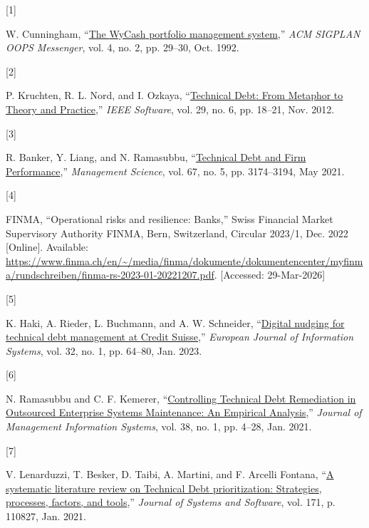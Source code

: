 \documentclass[
  journal,
]{IEEEtran}%
\newlength{\cslhangindent}
\newlength{\csllabelwidth}
\newenvironment{CSLReferences}[2] %
 {\begin{list}{}{%
  \setlength{\itemindent}{0pt}
  \setlength{\leftmargin}{0pt}
  \setlength{\parsep}{0pt}
  \ifodd #1
   \setlength{\leftmargin}{\cslhangindent}
   \setlength{\itemindent}{-1\cslhangindent}
  \fi
  \setlength{\itemsep}{#2\baselineskip}}}
 {\end{list}}
\newcommand{\CSLLeftMargin}[1]{\parbox[t]{\csllabelwidth}{\strut#1\strut}}
\newcommand{\CSLRightInline}[1]{\parbox[t]{\linewidth - \csllabelwidth}{\strut#1\strut}}
\begin{document}
\label{refs}
\begin{CSLReferences}{0}{0}
\CSLLeftMargin{{[}1{]} }%
\CSLRightInline{W. Cunningham,
{``\href{https://doi.org/10.1145/157710.157715}{The {WyCash} portfolio
management system},''} \emph{ACM SIGPLAN OOPS Messenger}, vol. 4, no. 2,
pp. 29--30, Oct. 1992. }

\CSLLeftMargin{{[}2{]} }%
\CSLRightInline{P. Kruchten, R. L. Nord, and I. Ozkaya,
{``\href{https://doi.org/10.1109/MS.2012.167}{Technical {Debt}: {From
Metaphor} to {Theory} and {Practice}},''} \emph{IEEE Software}, vol. 29,
no. 6, pp. 18--21, Nov. 2012. }

\CSLLeftMargin{{[}3{]} }%
\CSLRightInline{R. Banker, Y. Liang, and N. Ramasubbu,
{``\href{https://doi.org/10.1287/mnsc.2019.3542}{Technical {Debt} and
{Firm Performance}},''} \emph{Management Science}, vol. 67, no. 5, pp.
3174--3194, May 2021. }

\CSLLeftMargin{{[}4{]} }%
\CSLRightInline{FINMA, {``Operational risks and resilience: {Banks},''}
Swiss Financial Market Supervisory Authority FINMA, Bern, Switzerland,
Circular 2023/1, Dec. 2022 {[}Online{]}. Available:
\url{https://www.finma.ch/en/~/media/finma/dokumente/dokumentencenter/myfinma/rundschreiben/finma-rs-2023-01-20221207.pdf}.
{[}Accessed: 29-Mar-2026{]}}

\CSLLeftMargin{{[}5{]} }%
\CSLRightInline{K. Haki, A. Rieder, L. Buchmann, and A. W. Schneider,
{``\href{https://doi.org/10.1080/0960085X.2022.2088413}{Digital nudging
for technical debt management at {Credit Suisse}},''} \emph{European
Journal of Information Systems}, vol. 32, no. 1, pp. 64--80, Jan. 2023.
}

\CSLLeftMargin{{[}6{]} }%
\CSLRightInline{N. Ramasubbu and C. F. Kemerer,
{``\href{https://doi.org/10.1080/07421222.2021.1870377}{Controlling
{Technical Debt Remediation} in {Outsourced Enterprise Systems
Maintenance}: {An Empirical Analysis}},''} \emph{Journal of Management
Information Systems}, vol. 38, no. 1, pp. 4--28, Jan. 2021. }

\CSLLeftMargin{{[}7{]} }%
\CSLRightInline{V. Lenarduzzi, T. Besker, D. Taibi, A. Martini, and F.
Arcelli Fontana, {``\href{https://doi.org/10.1016/j.jss.2020.110827}{A
systematic literature review on {Technical Debt} prioritization:
{Strategies}, processes, factors, and tools},''} \emph{Journal of
Systems and Software}, vol. 171, p. 110827, Jan. 2021. }


\end{CSLReferences}
\end{document}
